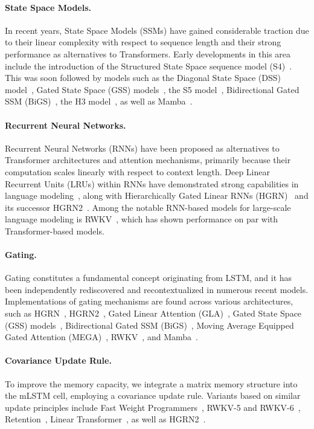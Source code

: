 \paragraph{State Space Models.} In recent years, State Space Models (SSMs) have gained considerable traction due to their linear complexity with respect to sequence length and their strong performance as alternatives to Transformers. Early developments in this area include the introduction of the Structured State Space sequence model (S4)~\citep{Gu:21}. This was soon followed by models such as the Diagonal State Space (DSS) model~\citep{Gupta:22}, Gated State Space (GSS) models~\citep{Mehta:22}, the S5 model~\citep{Smith:22}, Bidirectional Gated SSM (BiGS)~\citep{Wang:22}, the H3 model~\citep{Fu:23}, as well as Mamba~\citep{Gu:24arxiv}.

\paragraph{Recurrent Neural Networks.} Recurrent Neural Networks (RNNs) have been proposed as alternatives to Transformer architectures and attention mechanisms, primarily because their computation scales linearly with respect to context length. Deep Linear Recurrent Units (LRUs) within RNNs have demonstrated strong capabilities in language modeling~\citep{Orvieto:23, De:24arxiv}, along with Hierarchically Gated Linear RNNs (HGRN)~\citep{Qin:23} and its successor HGRN2~\citep{Qin:24arxiv}. Among the notable RNN-based models for large-scale language modeling is RWKV~\citep{Peng:23arxivshort,Peng:24arxivshort}, which has shown performance on par with Transformer-based models.

\paragraph{Gating.}
Gating constitutes a fundamental concept originating from LSTM, and it has been independently rediscovered and recontextualized in numerous recent models. Implementations of gating mechanisms are found across various architectures, such as HGRN~\citep{Qin:23}, HGRN2~\citep{Qin:24arxiv}, Gated Linear Attention (GLA)~\citep{Yang:23arxiv}, Gated State Space (GSS) models~\citep{Mehta:22}, Bidirectional Gated SSM (BiGS)~\citep{Wang:22}, Moving Average Equipped Gated Attention (MEGA)~\citep{Ma:22}, RWKV~\citep{Peng:23arxivshort}, and Mamba~\citep{Gu:24arxiv}.

\paragraph{Covariance Update Rule.} 
To improve the memory capacity, we integrate a matrix memory structure into the mLSTM cell, employing a covariance update rule. Variants based on similar update principles include Fast Weight Programmers~\citep{Schmidhuber:92ncfastweights,Schlag:21}, RWKV-5 and RWKV-6~\citep{Peng:24arxivshort}, Retention~\citep{Sun:23arxiv}, Linear Transformer~\citep{Katharopoulos:20}, as well as HGRN2~\citep{Qin:24arxiv}.

